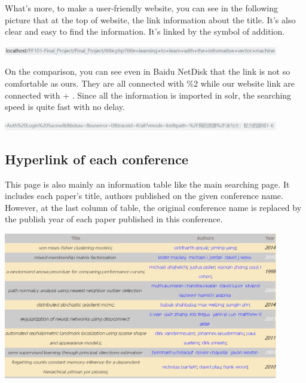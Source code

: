 \documentclass[10pt,twoside,a4paper,titlepage]{article}
\begin{document}
What’s more, to make a user-friendly website, you can see in the following picture that at the top of website, the link information about the title. It’s also clear and easy to find the information. It’s linked by the symbol of addition.\par
\includegraphics[width=0.9\textwidth]{jaf/link.PNG}\newline\par
 On the comparison, you can see even in Baidu NetDisk that the link is not so comfortable as ours. They are all connected with \%2 while our website link are connected with + . Since all the information is imported in solr, the searching speed is quite fast with no delay.\par
\includegraphics[width=0.9\textwidth]{jaf/linked.PNG}\newline\par
\subsection{Hyperlink of each conference}
This page is also mainly an information table like the main searching page. It includes each paper’s title, authors published on the given conference name. However, at the last column of table, the original conference name is replaced by the publish year of each paper published in this conference.\par
\includegraphics[width=0.9\textwidth]{jaf/conference.PNG}\newline\par
\end{document}
